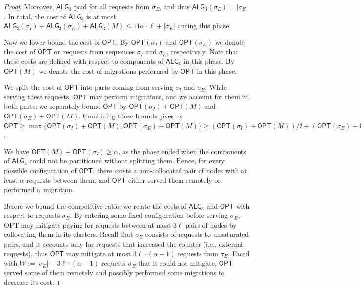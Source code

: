 \documentclass[manuscript,screen=true, review, anonymous]{acmart}
\newcommand{\OPT}{\textsf{OPT}\xspace}
\newcommand{\TAlg}{{\ensuremath{\textsf{ALG}_{3}}}\xspace}
\newcommand\maciek[1]{\color{brown}\textbf{(Maciek: #1)}\color{black}}
\begin{document}
\begin{proof}
	
	Moreover, \TAlg paid for all requests from $\sigma_E$, and thus $\TAlg(\sigma_E) = |\sigma_E|$.
	In total, the cost of \TAlg is at most $\TAlg(\sigma_I) + \TAlg(\sigma_E) + \TAlg(M) \leq 11\alpha\cdot \ell + |\sigma_E|$ during this phase.
	
	\medskip
	
	Now we lower-bound the cost of $\OPT$.
	By $\OPT(\sigma_I)$ and $\OPT(\sigma_E)$ we denote the cost of $\OPT$ on requests from sequences $\sigma_I$ and $\sigma_E$, respectively.
	Note that these costs are defined with respect to components of \TAlg in this phase.
	By $\OPT(M)$ we denote the cost of migrations performed by $\OPT$ in this phase.
	
	We split the cost of $\OPT$ into parts coming from serving $\sigma_I$ and $\sigma_E$.
	While serving these requests, $\OPT$ may perform migrations, and we account for them in both parts: we separately bound $\OPT$ by $\OPT(\sigma_I) + \OPT(M)$ and $\OPT(\sigma_E) + \OPT(M)$.
	Combining those bounds gives us $\OPT \geq \max\{\OPT(\sigma_I) + \OPT(M), \OPT(\sigma_E) + \OPT(M)\} \geq (\OPT(\sigma_I) + \OPT(M)) / 2 + (\OPT(\sigma_E) + \OPT(M)) / 2$.
	
	
	We have $\OPT(M) + \OPT(\sigma_I) \geq \alpha$, as the phase ended when the components of \TAlg{} could not be partitioned without splitting them.
	Hence, for every possible configuration of $\OPT$, there exists a non-collocated pair of nodes with at least $\alpha$ requests between them, and
	$\OPT$ either served them remotely or performed a~migration.
	
	\medskip
	Before we bound the competitive ratio, we relate the costs of $\TAlg$ and $\OPT$ with respect to requests $\sigma_E$.
	By entering some fixed configuration before serving $\sigma_E$, \OPT may mitigate paying for requests between at most $3\ell$ pairs of nodes by collocating them in its clusters.
	Recall that $\sigma_E$ consists of requests to unsaturated pairs, and it accounts only for requests that increased the counter (i.e., external requests), thus $\OPT$ may mitigate at most $3\ell\cdot(\alpha - 1)$ requests from $\sigma_E$.
	Faced with $W := |\sigma_E| - 3\ell\cdot(\alpha-1)$ requests $\sigma_E$ that it could not mitigate, $\OPT$ served some of them remotely and possibly performed some migrations to decrease its cost.
	

\end{proof}
\end{document}
